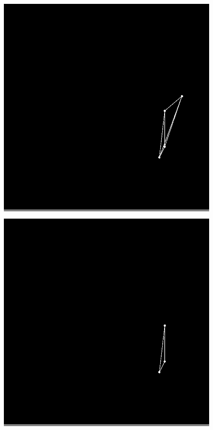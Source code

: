 \documentclass{article}
\begin{document}
\begin{figure}
\begin{minipage}{0.2\textwidth}
            \end{minipage}
            \vskip 0.1in
            \begin{minipage}{0.2\textwidth}
            \colorbox{gray}{\includegraphics[width=\linewidth]{./images/slvo-16.png}}
            \end{minipage}
            \hspace{\fill}
            \begin{minipage}{0.2\textwidth}
            \colorbox{gray}{\includegraphics[width=\linewidth]{./images/slvo-17.png}}

\end{minipage}
\end{figure}
\end{document}
